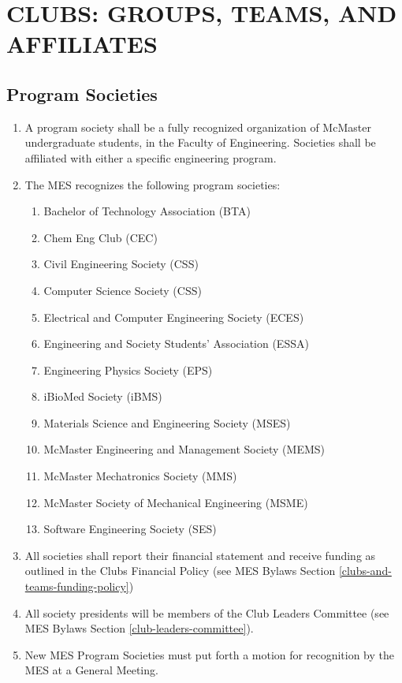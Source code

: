  \section{CLUBS: GROUPS, TEAMS, AND AFFILIATES}
\label{clubs-groups-teams-and-affiliates}

\subsection{Program Societies}
\label{program-societies}
\begin{enumerate}
 \item
  A program society shall be a fully recognized organization of McMaster
  undergraduate students, in the Faculty of Engineering. Societies shall
  be affiliated with either a specific engineering program.
 \item
  The MES recognizes the following program societies:

  \begin{enumerate}
   \item
    Bachelor of Technology Association (BTA)
   \item
    Chem Eng Club (CEC)
   \item
    Civil Engineering Society (CSS)
   \item
    Computer Science Society (CSS)
   \item
    Electrical and Computer Engineering Society (ECES)
   \item
    Engineering and Society Students' Association (ESSA)
   \item
    Engineering Physics Society (EPS)
   \item
    iBioMed Society (iBMS)
   \item
    Materials Science and Engineering Society (MSES)
   \item
    McMaster Engineering and Management Society (MEMS)
   \item
    McMaster Mechatronics Society (MMS)
   \item
    McMaster Society of Mechanical Engineering (MSME)
   \item
    Software Engineering Society (SES)
  \end{enumerate}
 \item
  All societies shall report their financial statement and receive
  funding as outlined in the Clubs Financial Policy (see MES Bylaws
  Section \ref{clubs-and-teams-funding-policy})
 \item
  All society presidents will be members of the Club Leaders Committee
  (see MES Bylaws Section \ref{club-leaders-committee}).
 \item
  New MES Program Societies must put forth a motion for recognition by
  the MES at a General Meeting.

\end{enumerate}


